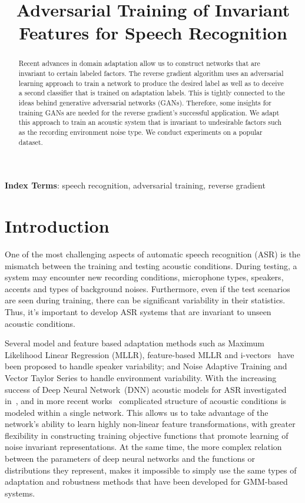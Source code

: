 \documentclass[a4paper]{article}
\title{Adversarial Training of Invariant Features for Speech Recognition}
\begin{document}
\maketitle
% 
\begin{abstract}
Recent advances in domain adaptation allow us to construct networks that are
invariant to certain labeled factors. The reverse gradient algorithm uses an
adversarial learning approach to train a network to produce the desired label
as well as to deceive a second classifier that is trained on adaptation 
labels. This is tightly connected to the ideas behind generative adversarial 
networks (GANs). Therefore, some insights for training GANs are needed for the
reverse gradient's successful application. We adapt this approach to train an 
acoustic system that is invariant to undesirable factors such as the recording
environment noise type. We conduct experiments on a popular dataset.
\end{abstract}
\noindent\textbf{Index Terms}: speech recognition, adversarial training, 
reverse gradient
\section{Introduction}
\label{sec:intro}
    One of the most challenging aspects of automatic speech recognition (ASR)
    is the mismatch between the training and testing acoustic conditions. 
    During testing, a system may encounter new recording conditions, 
    microphone types, speakers, accents and types of background noises. 
    Furthermore, even if the test scenarios are seen during training, there 
    can be significant variability in their statistics. Thus, it's important to 
    develop ASR systems that are invariant to unseen acoustic conditions.

    Several model and feature based adaptation methods such as Maximum 
    Likelihood Linear Regression (MLLR),  feature-based MLLR and 
    i-vectors~\citep{saon2013speaker} have been proposed to handle speaker 
    variability; and Noise Adaptive Training \citep[NAT;][]{kalinli2010noise}
    and Vector Taylor Series \citep[VTS;][]{un1998speech} to handle 
    environment variability.
    With the increasing success of Deep Neural 
    Network~(DNN) acoustic models for ASR investigated 
    in~\citep{hinton2012deep,seide2011conversational,sainath2011making}, 
    and in more recent works~\citep{miao2015eesen,sainath2015learning} 
    complicated structure of acoustic conditions is modeled within a single network.
    This allows us to take 
    advantage of the network's ability to learn highly non-linear feature 
    transformations, with greater flexibility in constructing training 
    objective functions that promote learning of noise invariant 
    representations.
    At the same time, the more complex relation between the parameters of deep
    neural networks and the functions or distributions they represent, makes it
    impossible to simply use the same types of adaptation and robustness methods
    that have been developed for GMM-based systems.
\end{document}
